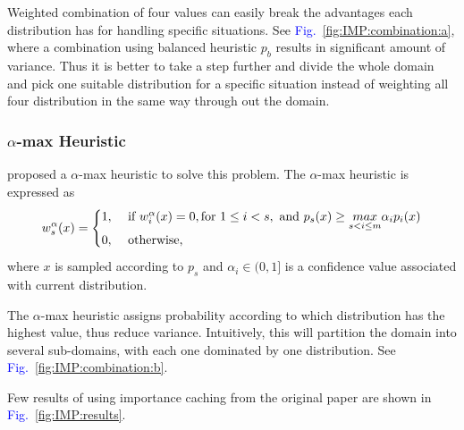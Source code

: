 \documentclass[]{book}
\renewcommand{\figurename}{\textcolor{blue}{Fig.\ }}
\begin{document}
Weighted combination of four values can easily break the advantages each distribution has for handling specific situations.
See \figurename \ref{fig:IMP:combination:a}, where a combination using balanced heuristic $p_b$ results in significant amount of variance.
Thus it is better to take a step further and divide the whole domain and pick one suitable distribution for a specific situation instead of weighting all four distribution in the same way through out the domain.

\subsubsection*{$\alpha$-max Heuristic}
\citeauthor{georgiev2012importance} proposed a $\alpha$-max heuristic to solve this problem.
The $\alpha$-max heuristic is expressed as
\begin{equation}
	w_s^\alpha(x) = \begin{cases}
	1, & \text{ if } w_i^\alpha(x) = 0, \textup{for } 1 \leq i < s, \textup{ and } p_s(x)\geq \underset{s<i\leq m}{max} \alpha_i p_i(x)\\ 
	0, & \text{ otherwise, } 
	\end{cases}
\end{equation}
where $x$ is sampled according to $p_s$ and $\alpha_i\in (0,1]$ is a confidence value associated with current distribution.

The $\alpha$-max heuristic assigns probability according to which distribution has the highest value, thus reduce variance.
Intuitively, this will partition the domain into several sub-domains, with each one dominated by one distribution.
See \figurename \ref{fig:IMP:combination:b}.

Few results of using importance caching from the original paper \cite{georgiev2012importance} are shown in \figurename \ref{fig:IMP:results}.
\end{document}
